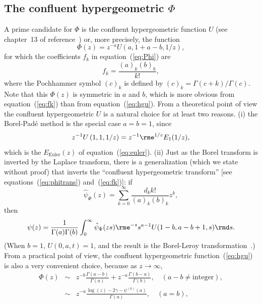 \documentclass[12pt]{iopart}
\begin{document}
\subsection{The confluent hypergeometric $\Phi$}
A prime candidate for $\Phi$ is the confluent hypergeometric function $U$ (see chapter~13 of reference~\cite{AS70})
or, more precisely, the function
%
\begin{equation}
	\label{eq:hgu}
	\Phi(z) = z^{-a}U \left( a,1+a-b, 1/z \right),
\end{equation}
%
for which the coefficients $f_k$ in equation~(\ref{eq:Phi}) are
%
\begin{equation}
	\label{eq:fk}
	f_k =  \frac{ (a)_k (b)_k } { k! },
\end{equation}
%
where the Pochhammer symbol $(c)_k$ is defined by $(c)_k = \Gamma(c+k)/\Gamma(c)$.
%
Note that this $\Phi(z)$ is symmetric in $a$ and $b$, which is more obvious from equation~(\ref{eq:fk}) than from equation~(\ref{eq:hgu}).
%
From a theoretical point of view the confluent hypergeometric $U$ is a natural choice for at least two reasons.
(i) the Borel-Pad\'e method is the special case $a=b=1$, since
%
\begin{equation}
	z^{-1} U\left( 1,1, 1/z \right) =  z^{-1} \rme^{1/z} E_1(1/z) ,
\end{equation}
%
which is the $E_\mathrm{Euler}(z)$ of equation~(\ref{eq:euler}).
(ii) Just as the Borel transform is inverted by the Laplace transform, there is a generalization
(which we state without proof) that inverts the ``confluent hypergeometric transform''
[see equations~(\ref{eq:phitrans}) and~(\ref{eq:fk})]: if
%
\begin{equation}
  \hat{\psi}_\Phi(z) = \sum_{k=0}^\infty \frac { d_k k! } {(a)_k (b)_k}  z^k,
\end{equation}
%
then
%
\begin{equation}
    \psi(z)  = \frac{1}{ \Gamma(a)  \Gamma(b) }
                   \int _0^\infty 
                   \hat{\psi}_\Phi( z s ) 
                   \rme^{-s} s^{a-1} U( 1 - b , a - b + 1 , s ) \rmd s.
\label{eq:inverseU}
\end{equation}
%
(When $b=1$, $U( 0 , a  , t ) = 1$, and the result is the Borel-Leroy transformation~\cite{ZJ10}.)
From a practical point of view, the confluent hypergeometric function~(\ref{eq:hgu}) is also a very
convenient choice, because as $z\to\infty$,
\begin{eqnarray}
	\Phi(z) & \sim & z^{-b} \frac{ \Gamma (a-b)}{\Gamma (a)}+ z^{-a} \frac{ \Gamma (b-a)}{\Gamma (b)},
  		\quad (a-b\ne \mathrm{integer}),
		 \label{eq:abLargeg} \\
		& \sim  & z^{-a}  \frac{  \log ( z ) - 2 \gamma -\psi ^{(0)} ( a ) }{\Gamma (a)},
		\quad (a=b),
\label{eq:aaLargeg}
\end{eqnarray}
\end{document}
